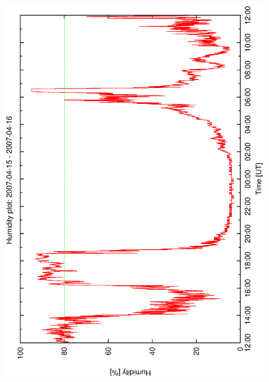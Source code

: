 \begin{figure}[htbp]
\begin{center}
{    \includegraphics[scale=0.25, angle=-90]{figures/ecs/hum_1_2007_04_15.eps}  
    \label{fig:hum_profile_2007_04_15}
  }
\end{center}
\end{figure}
